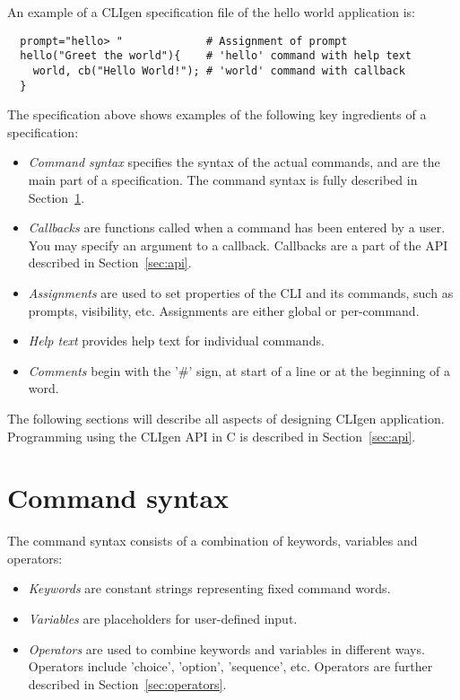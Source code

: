 \documentclass[a4paper, 10pt] {article}
\begin{document}
An example of a CLIgen specification file of the hello world application is:
\begin{verbatim}
  prompt="hello> "             # Assignment of prompt
  hello("Greet the world"){    # 'hello' command with help text
    world, cb("Hello World!"); # 'world' command with callback
  }
\end{verbatim}

The specification above shows examples of the following key ingredients of a specification:
\begin{itemize} 
\item
\emph{Command syntax} specifies the syntax of the actual commands, and
are the main part of a specification. The command syntax is fully
described in Section~\ref{sec:syntax}.
\item
\emph{Callbacks} are functions called when a command has been entered
by a user. You may specify an argument to a callback. Callbacks
are a part of the API described in Section~\ref{sec:api}.
\item
\emph{Assignments} are used to set properties of the CLI and its
commands, such as prompts, visibility, etc. Assignments are either global or per-command.
\item
\emph{Help text} provides help text for individual commands.
\item
\emph{Comments} begin with the '\#' sign, at start of a line or at the beginning of a word.
\end{itemize}

The following sections will describe all aspects of designing CLIgen
application. Programming using the CLIgen API in C is described in
Section~\ref{sec:api}.

\section{Command syntax}
\label{sec:syntax}

The command syntax consists of a combination of keywords, variables and
operators:
\begin{itemize}
\item
\emph{Keywords} are constant strings representing fixed command words.
\item
\emph{Variables} are placeholders for user-defined input.
\item
\emph{Operators} are used to combine keywords and variables in different ways. Operators
include 'choice', 'option', 'sequence', etc. Operators are further described in Section~\ref{sec:operators}.
\end{itemize}
\end{document}
